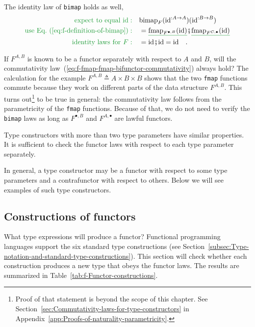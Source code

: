 The identity law of \lstinline!bimap! holds as well,
\begin{align*}
{\color{greenunder}\text{expect to equal }\text{id}:}\quad & \text{bimap}_{F}(\text{id}^{:A\rightarrow A})(\text{id}^{:B\rightarrow B})\\
{\color{greenunder}\text{use Eq.~(\ref{eq:f-definition-of-bimap})}:}\quad & =\gunderline{\text{fmap}_{F^{\bullet,B}}(\text{id})}\bef\gunderline{\text{fmap}_{F^{C,\bullet}}(\text{id})}\\
{\color{greenunder}\text{identity laws for }F:}\quad & =\text{id}\bef\text{id}=\text{id}\quad.
\end{align*}

If $F^{A,B}$ is known to be a functor separately with respect to
$A$ and $B$, will the commutativity law~(\ref{eq:f-fmap-fmap-bifunctor-commutativity})
always hold? The calculation for the example $F^{A,B}\triangleq A\times B\times B$
shows that the two \lstinline!fmap! functions commute because they
work on different parts of the data structure $F^{A,B}$. This turns
out\footnote{Proof of that statement is beyond the scope of this chapter. See Section~\ref{sec:Commutativity-laws-for-type-constructors}
in Appendix~\ref{app:Proofs-of-naturality-parametricity}.} to be true in general: the commutativity law follows from the parametricity
of the \lstinline!fmap! functions. Because of that, we do not need
to verify the \lstinline!bimap! laws as long as $F^{\bullet,B}$
and $F^{A,\bullet}$ are lawful functors.

Type constructors with more than two type parameters have similar
properties. It is sufficient to check the functor laws with respect
to each type parameter separately.

In general, a type constructor may be a functor with respect to some
type parameters and a contrafunctor with respect to others. Below
we will see examples of such type constructors.

\subsection{Constructions of functors\label{subsec:f-Functor-constructions}}

What type expressions will produce a functor? Functional programming
languages support the six standard type constructions (see Section~\ref{subsec:Type-notation-and-standard-type-constructions}).
This section will check whether each construction produces a new type
that obeys the functor laws. The results are summarized in Table~\ref{tab:f-Functor-constructions}.

